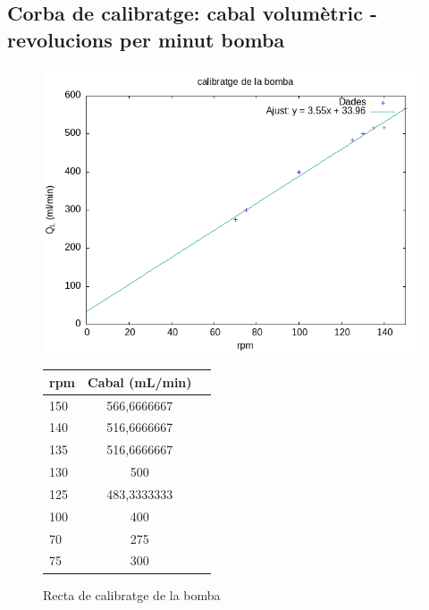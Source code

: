 \documentclass[10pt, twoside]{article}
\begin{document}
\subsection{Corba de calibratge: cabal volumètric - revolucions per minut bomba}

\begin{figure}[hbt!]
    \centering
    \begin{minipage}{0.45\textwidth}
        \centering
        \includegraphics[width=0.9\linewidth]{calibomba.png} %
        \caption{Recta de calibratge de la bomba}
        \label{fig:calibomba}
    \end{minipage}%
    \hfill 
    \begin{minipage}{0.45\textwidth}
        \centering
        \label{tab:calibomba}
        \begin{tabular}{|l|c|r|}
            \hline
            rpm	&	Cabal (mL/min)	\\ \hline
            150	&	566,6666667	\\ \hline
            140	&	516,6666667	\\ \hline
            135	&	516,6666667	\\ \hline
            130	&	500	\\ \hline
            125	&	483,3333333	\\ \hline
            100	&	400	\\ \hline
            70	&	275	\\ \hline
            75	&	300	\\ \hline
                          
        \end{tabular}
    \end{minipage}

\end{figure}
\end{document}
